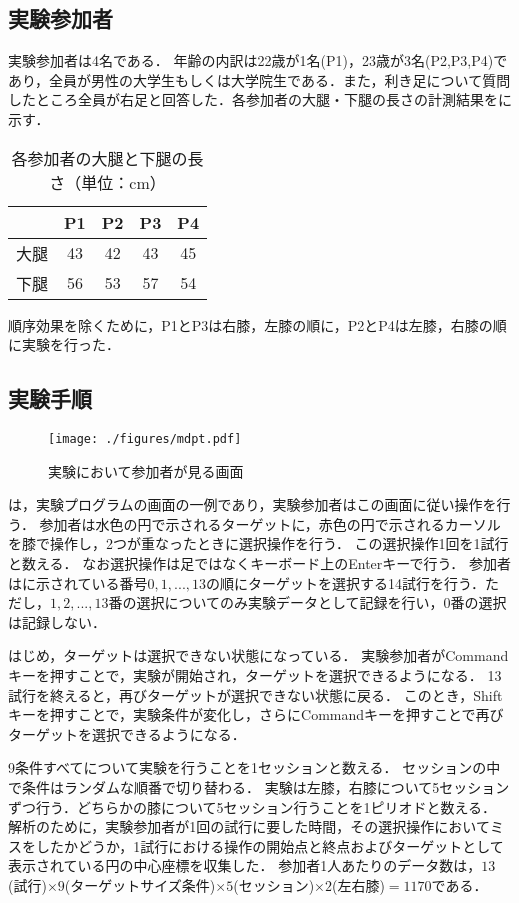\documentclass[submit, techrep]{ipsj}
\begin{document}
\subsection{実験参加者}
実験参加者は4名である．
年齢の内訳は22歳が1名(P1)，23歳が3名(P2,P3,P4)であり，全員が男性の大学生もしくは大学院生である．また，利き足について質問したところ全員が右足と回答した．各参加者の大腿・下腿の長さの計測結果をに示す．
\begin{table}[tb]
	\begin{center}
	\caption{各参加者の大腿と下腿の長さ（単位：cm）}
		\begin{tabular}{|c|c|c|c|c|}
		\hline
			& P1 & P2 & P3 & P4 \\ \hline
		大腿 & 43 & 42 & 43 & 45 \\ \hline
		下腿 & 56 & 53 & 57 & 54 \\ \hline
		\end{tabular}
		\label{tb:length}
	\end{center}
\end{table}

順序効果を除くために，P1とP3は右膝，左膝の順に，P2とP4は左膝，右膝の順に実験を行った．
\subsection{実験手順}
\begin{figure}[tb]
	\begin{center}
		\texttt{[image: ./figures/mdpt.pdf]}
	\end{center}
	\caption{実験において参加者が見る画面}
	\label{img:mdpt}
\end{figure}
は，実験プログラムの画面の一例であり，実験参加者はこの画面に従い操作を行う．
参加者は水色の円で示されるターゲットに，赤色の円で示されるカーソルを膝で操作し，2つが重なったときに選択操作を行う．
この選択操作1回を1試行と数える．
なお選択操作は足ではなくキーボード上のEnterキーで行う．
参加者はに示されている番号$0,1,...,13$の順にターゲットを選択する14試行を行う．ただし，$1,2,...,13$番の選択についてのみ実験データとして記録を行い，$0$番の選択は記録しない．\par
はじめ，ターゲットは選択できない状態になっている．
実験参加者がCommandキーを押すことで，実験が開始され，ターゲットを選択できるようになる．
13試行を終えると，再びターゲットが選択できない状態に戻る．
このとき，Shiftキーを押すことで，実験条件が変化し，さらにCommandキーを押すことで再びターゲットを選択できるようになる．\par
9条件すべてについて実験を行うことを1セッションと数える．
セッションの中で条件はランダムな順番で切り替わる．
実験は左膝，右膝について5セッションずつ行う．どちらかの膝について5セッション行うことを1ピリオドと数える．
解析のために，実験参加者が1回の試行に要した時間，その選択操作においてミスをしたかどうか，1試行における操作の開始点と終点およびターゲットとして表示されている円の中心座標を収集した．
参加者1人あたりのデータ数は，$13$(試行)$\times 9$(ターゲットサイズ条件)$\times 5$(セッション)$\times 2$(左右膝)$ = 1170$である．
\end{document}
